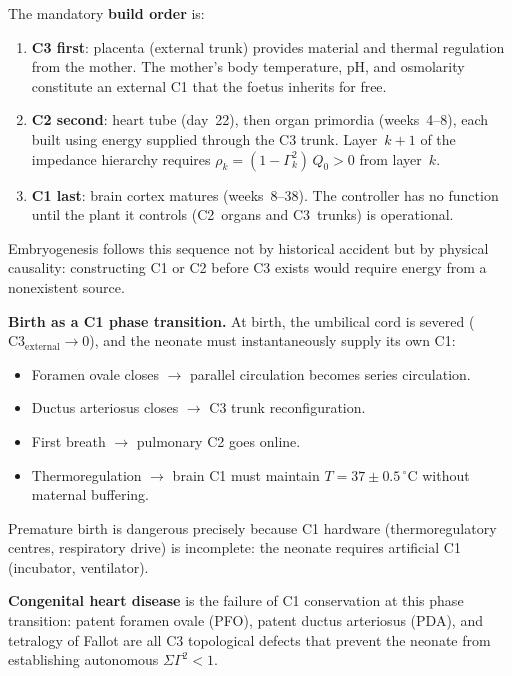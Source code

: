 \documentclass[aps,pre,twocolumn,superscriptaddress,floatfix]{revtex4-2}
\begin{document}
\begin{remark}
The mandatory \textbf{build order} is:
\begin{enumerate}
  \item \textbf{C3 first}: placenta (external trunk)
    provides material and thermal regulation from
    the mother.  The mother's body temperature,
    pH, and osmolarity constitute an external C1
    that the foetus inherits for free.
  \item \textbf{C2 second}: heart tube (day~22),
    then organ primordia (weeks~4--8), each built
    using energy supplied through the C3 trunk.
    Layer~$k\!+\!1$ of the impedance hierarchy
    requires
    $\rho_k = (1 - \Gamma_k^2)\,Q_0 > 0$ from
    layer~$k$.
  \item \textbf{C1 last}: brain cortex matures
    (weeks~8--38).  The controller has no function
    until the plant it controls (C2~organs and
    C3~trunks) is operational.
\end{enumerate}

Embryogenesis follows this sequence not by
historical accident but by physical causality:
constructing C1 or C2 before C3 exists would
require energy from a nonexistent source.

\textbf{Birth as a C1 phase transition.}
At birth, the umbilical cord is severed
($\text{C3}_{\mathrm{external}} \to 0$), and the
neonate must instantaneously supply its own C1:
\begin{itemize}
  \item Foramen ovale closes $\to$ parallel
    circulation becomes series circulation.
  \item Ductus arteriosus closes $\to$ C3 trunk
    reconfiguration.
  \item First breath $\to$ pulmonary C2 goes
    online.
  \item Thermoregulation $\to$ brain C1 must
    maintain $T = 37 \pm 0.5\,^\circ$C without
    maternal buffering.
\end{itemize}
Premature birth is dangerous precisely because
C1 hardware (thermoregulatory centres, respiratory
drive) is incomplete: the neonate requires
artificial C1 (incubator, ventilator).

\textbf{Congenital heart disease} is the failure of
C1 conservation at this phase transition:
patent foramen ovale (PFO), patent ductus
arteriosus (PDA), and tetralogy of Fallot are all
C3 topological defects that prevent the neonate
from establishing autonomous $\Sigma\Gamma^2 < 1$.
\end{remark}
\end{document}
